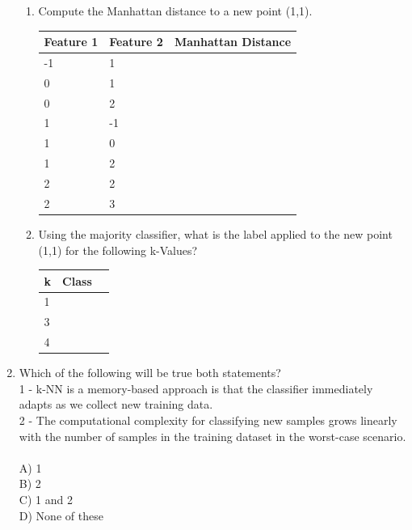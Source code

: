 \documentclass{report}
\begin{document}
\begin{enumerate}
  	\begin{enumerate}
  	  \item Compute the Manhattan distance to a new point (1,1).
        \begin{center}
          \begin{tabular}{| l | l | l |}
            \hline
            Feature 1 & Feature 2 & Manhattan Distance \\ \hline
            -1 & 1 &  \\
            0 & 1 &  \\
            0 & 2 &  \\
            1 & -1 &  \\
            1 & 0 &  \\
            1 & 2 &  \\
            2 & 2 &  \\
            2 & 3 &  \\
            \hline
        \end{tabular}
      \end{center}
    
    \item Using the majority classifier, what is the label applied to the new point (1,1) for the following k-Values?
      \begin{center}
        \begin{tabular}{| l | l | l |}
          \hline
          k & Class \\ \hline
          1 & \\
          3 & \\
          4 & \\
          \hline
        \end{tabular}
      \end{center}       	  
  	\end{enumerate}

  \item Which of the following will be true both statements? \\

	1 - k-NN is a memory-based approach is that the classifier immediately adapts as we collect new training data. \\
	2 - The computational complexity for classifying new samples grows linearly with the number of samples in the training dataset in the worst-case scenario. \\ \\
		A) 1 \\
		B) 2 \\
		C) 1 and 2 \\
		D) None of these \\

\end{enumerate}
\end{document}
